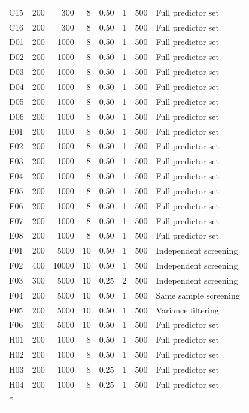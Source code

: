 \begin{longtable}[t]{lrrrrrrl}
C15 & 200 & 300 & 8 & 0.50 & 1 & 500 & Full predictor set\\
C16 & 200 & 300 & 8 & 0.50 & 1 & 500 & Full predictor set\\
D01 & 200 & 1000 & 8 & 0.50 & 1 & 500 & Full predictor set\\
D02 & 200 & 1000 & 8 & 0.50 & 1 & 500 & Full predictor set\\
D03 & 200 & 1000 & 8 & 0.50 & 1 & 500 & Full predictor set\\
D04 & 200 & 1000 & 8 & 0.50 & 1 & 500 & Full predictor set\\
D05 & 200 & 1000 & 8 & 0.50 & 1 & 500 & Full predictor set\\
D06 & 200 & 1000 & 8 & 0.50 & 1 & 500 & Full predictor set\\
E01 & 200 & 1000 & 8 & 0.50 & 1 & 500 & Full predictor set\\
E02 & 200 & 1000 & 8 & 0.50 & 1 & 500 & Full predictor set\\
E03 & 200 & 1000 & 8 & 0.50 & 1 & 500 & Full predictor set\\
E04 & 200 & 1000 & 8 & 0.50 & 1 & 500 & Full predictor set\\
E05 & 200 & 1000 & 8 & 0.50 & 1 & 500 & Full predictor set\\
E06 & 200 & 1000 & 8 & 0.50 & 1 & 500 & Full predictor set\\
E07 & 200 & 1000 & 8 & 0.50 & 1 & 500 & Full predictor set\\
E08 & 200 & 1000 & 8 & 0.50 & 1 & 500 & Full predictor set\\
F01 & 200 & 5000 & 10 & 0.50 & 1 & 500 & Independent screening\\
F02 & 400 & 10000 & 10 & 0.50 & 1 & 500 & Independent screening\\
F03 & 300 & 5000 & 10 & 0.25 & 2 & 500 & Independent screening\\
F04 & 200 & 5000 & 10 & 0.50 & 1 & 500 & Same sample screening\\
F05 & 200 & 5000 & 10 & 0.50 & 1 & 500 & Variance filtering\\
F06 & 200 & 5000 & 10 & 0.50 & 1 & 500 & Full predictor set\\
H01 & 200 & 1000 & 8 & 0.50 & 1 & 500 & Full predictor set\\
H02 & 200 & 1000 & 8 & 0.50 & 1 & 500 & Full predictor set\\
H03 & 200 & 1000 & 8 & 0.25 & 1 & 500 & Full predictor set\\
H04 & 200 & 1000 & 8 & 0.25 & 1 & 500 & Full predictor set\\*
\end{longtable}
